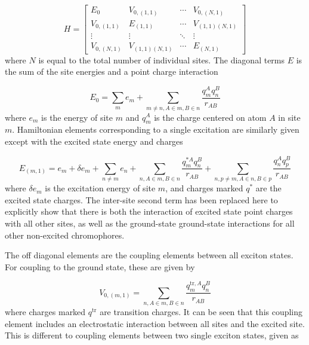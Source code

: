 \begin{equation}
    H = 
    \begin{bmatrix}
        E_0 & V_{0, \left(1, 1\right)} & \cdots & V_{0, \left(N, 1\right)} \\
        V_{0, \left(1, 1\right)} & E_{\left(1,1\right)} & \cdots & V_{\left(1,1\right) \left(N, 1\right)} \\
        \vdots & \vdots & \ddots & \vdots \\
        V_{0, \left(N, 1\right)} & V_{\left(1,1\right) \left(N, 1\right)} & \cdots & E_{\left(N, 1\right)}
    \end{bmatrix}
\end{equation}
%
where $N$ is equal to the total number of individual sites. The diagonal terms $E$
is the sum of the site energies and a point charge interaction

\begin{equation}
    E_0 = \sum_m e_m + \sum_{m \neq n, A \in m, B \in n} \frac{q^A_m q^B_n}{r_{AB}}
\end{equation}
%
where $e_m$ is the energy of site $m$ and $q^A_m$ is the charge centered on atom
$A$ in site $m$. Hamiltonian elements corresponding to a single excitation are similarly
given except with the excited state energy and charges

\begin{equation}
    E_{\left(m,1\right)} = e_m + \delta e_m + \sum_{n \neq m} e_n + \sum_{n, A \in m, B \in n} \frac{q^{\ast A}_m q^B_n}{r_{AB}} + \sum_{n,p \neq m, A \in n, B \in p} \frac{q^{A}_n q^B_p}{r_{AB}}
\end{equation}
%
where $\delta e_m$ is the excitation energy of site $m$, and charges marked $q^\ast$
are the excited state charges. The inter-site second term has been replaced here
to explicitly show that there is both the interaction of excited state point charges
with all other sites, as well as the ground-state ground-state interactions for 
all other non-excited chromophores.

The off diagonal elements are the coupling elements between all exciton states.
For coupling to the ground state, these are given by

\begin{equation}
    V_{0, \left(m,1\right)} = \sum_{n, A \in m, B \in n} \frac{q^{\text{tr},A}_m q^B_n}{r_{AB}}
\end{equation}
%
where charges marked $q^{\text{tr}}$ are transition charges. It can be seen that 
this coupling element includes an electrostatic interaction between all sites and
the excited site. This is different to coupling elements between two single exciton
states, given as

